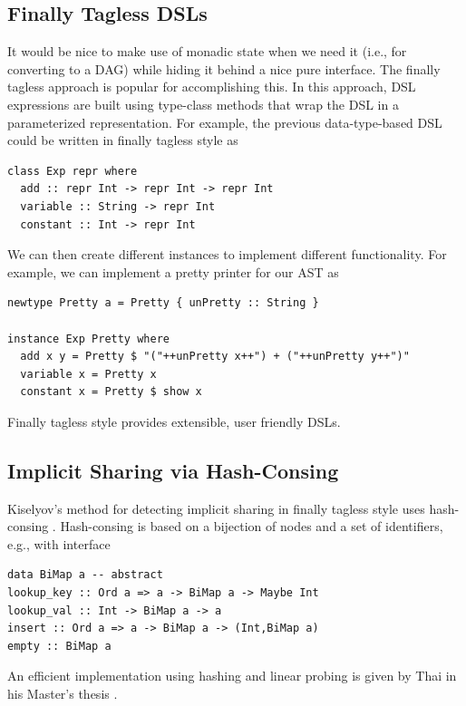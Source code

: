 \documentclass[runningheads]{llncs}
\begin{document}
\subsection{Finally Tagless DSLs}

 It would be nice
to make use of monadic state when we need it (i.e., for converting to a DAG)
while hiding it behind a nice pure interface. The finally tagless approach 
\cite{carette:finallytagless} is popular for accomplishing this. In this
approach, DSL expressions are built using type-class methods that wrap the DSL in
a parameterized representation. For example, the previous data-type-based DSL
could be written in finally tagless style as

\begin{verbatim}
class Exp repr where
  add :: repr Int -> repr Int -> repr Int
  variable :: String -> repr Int
  constant :: Int -> repr Int
\end{verbatim}

We can then create different instances to implement different functionality.
For example, we can implement a pretty printer for our AST as
\begin{verbatim}
newtype Pretty a = Pretty { unPretty :: String }

instance Exp Pretty where
  add x y = Pretty $ "("++unPretty x++") + ("++unPretty y++")"
  variable x = Pretty x
  constant x = Pretty $ show x
\end{verbatim}

Finally tagless style provides extensible, user friendly DSLs.

\subsection{Implicit Sharing via Hash-Consing}

Kiselyov's method
 for detecting implicit sharing in finally tagless
style uses hash-consing \cite{kiselyov:sharing}.
Hash-consing is based on a bijection of nodes and a set of identifiers,
e.g., with interface 
\begin{verbatim}
data BiMap a -- abstract
lookup_key :: Ord a => a -> BiMap a -> Maybe Int
lookup_val :: Int -> BiMap a -> a
insert :: Ord a => a -> BiMap a -> (Int,BiMap a)
empty :: BiMap a
\end{verbatim}
An efficient implementation using hashing and linear probing is given by Thai
in his Master's thesis \cite{thai2021type}.
\end{document}
